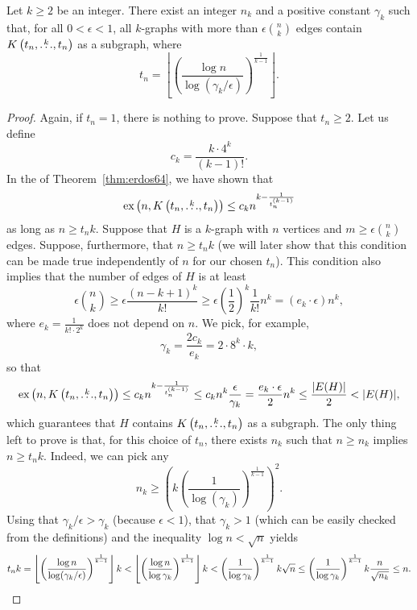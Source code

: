 \begin{theorem} \label{thm:erdos64-constant-density}
    Let $k \geq 2$ be an integer.
    There exist an integer $n_k$ and a positive constant $\gamma_k$
    such that, for all
    $0 < \epsilon < 1$,
    all $k$-graphs with more than $\epsilon \binom{n}{k}$ edges
    contain $K\left(t_n, \overset{k}{\dots}, t_n\right)$ as a subgraph, where
    \[
        t_n = \left\lfloor \left( \frac{\log n}{\log(\gamma_k/\epsilon)} \right)^{\frac{1}{k-1}} \right\rfloor.
    \]
    \begin{proof}
        Again, if $t_n=1$, there is nothing to prove.
        Suppose that $t_n \geq 2$.
        Let us define
        \[
            c_k = \frac{k \cdot 4^k}{(k-1)!}.
        \]
        In the  of Theorem~\ref{thm:erdos64}, we have shown that
        \[
            \text{ex} \left( n, K\left(t_n, \overset{k}{\dots}, t_n\right) \right) \leq c_k n^{k - \frac{1}{t_n^{(k-1)}}}
        \]
        as long as $n \geq t_n k$.
        Suppose that $H$ is a $k$-graph with $n$ vertices and $m \geq \epsilon \binom{n}{k}$ edges.
        Suppose, furthermore, that $n \geq t_n k$
        (we will later show that this condition can be made true independently of $n$ for our chosen $t_n$).
        This condition also implies that the number of edges of $H$ is at least
        \[
            \epsilon \binom{n}{k} \geq \epsilon \frac{(n - k + 1)^k}{k!} \geq \epsilon \left( \frac{1}{2} \right)^k \frac{1}{k!} n^{k} = (e_k  \cdot \epsilon) n^{k},
        \]
        where $e_k = \frac{1}{k! \cdot 2^k}$ does not depend on $n$.
        We pick, for example,
        \[
             \gamma_k = \frac{2c_k}{e_k} = 2 \cdot 8^k \cdot k,
        \]
        so that
        \[
            \text{ex} \left( n, K\left(t_n, \overset{k}{\dots}, t_n\right) \right) \leq c_k n^{k - \frac{1}{t_n^{(k-1)}}} \leq c_k n^k  \frac{\epsilon}{\gamma_k}
            = \frac{e_k \cdot \epsilon}{2} n^{k} \leq  \frac{|E(H)|}{2} < |E(H)|,
        \]
        which guarantees that $H$ contains $K\left(t_n, \overset{k}{\dots}, t_n\right)$ as a subgraph.
        The only thing left to prove is that, for this choice of $t_n$, there exists $n_k$
        such that $n \geq n_k$ implies $n \geq t_n k$.
        Indeed, we can pick any
        \[
            n_k \geq \left( k \left(\frac{1}{\log(\gamma_k)} \right)^{\frac{1}{k-1}}\right)^2.
        \]
        Using that $\gamma_k / \epsilon > \gamma_k$ (because $\epsilon < 1$),
        that $\gamma_k > 1$ (which can be easily checked from the definitions)
        and the inequality $\log n < \sqrt{n}$ yields
        \[
            t_n k
            = \left\lfloor \left( \frac{\log n}{\log(\gamma_k / \epsilon)} \right)^{\frac{1}{k-1}} \right\rfloor k
            < \left\lfloor \left( \frac{\log n}{\log\gamma_k} \right)^{\frac{1}{k-1}} \right\rfloor k
            <   \left( \frac{1}{\log \gamma_k} \right)^{\frac{1}{k-1}} k \sqrt{n}
            \leq \left( \frac{1}{\log \gamma_k} \right)^{\frac{1}{k-1}} k \frac{n}{\sqrt{n_k}}
            \leq n. \qedhere
        \]
    \end{proof}
\end{theorem}

